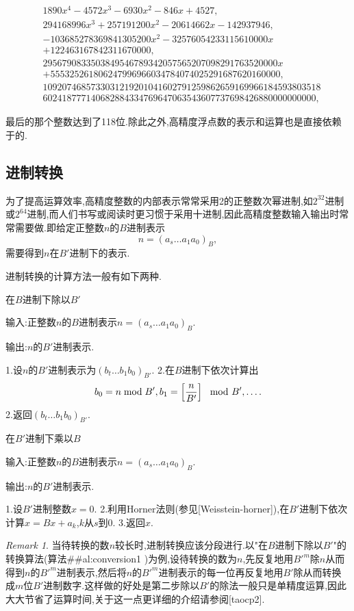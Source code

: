 \documentclass{ctexart}
\newcommand\mtcasCite[1]{[#1]}
\theoremstyle{remark}
\newtheorem{remark}{Remark}
\theoremstyle{definition}
\begin{document}
\begin{align*}
&1890x^4-4572x^3-6930x^2-846x+4527,\\
&294168996x^3+257191200x^2-20614662x-142937946,\\
&-103685278369841305200x^2-32576054233115610000x\\
&+122463167842311670000,\\
&2956790833503849546789342057565207098291763520000x\\
&+555325261806247996966034784074025291687620160000,\\
&1092074685733031219201041602791259862659169966184593803518\\
&602418777140682884334769647063543607737698426880000000000,
\end{align*}

最后的那个整数达到了118位.除此之外,高精度浮点数的表示和运算也是直接依赖于的.

\subsection{进制转换}

为了提高运算效率,高精度整数的内部表示常常采用2的正整数次幂进制,如$2^{32}$进制或$2^{64}$进制,而人们书写或阅读时更习惯于采用十进制,因此高精度整数输入输出时常常需要做.即给定正整数$n$的$B$进制表示$$n=(a_s\ldots a_1a_0)_B,$$需要得到$n$在$B'$进制下的表示.

进制转换的计算方法一般有如下两种.
\begin{algorithm}{在$B$进制下除以$B'$}\label{al:conversion1}

输入:正整数$n$的$B$进制表示$n=(a_s\ldots a_1a_0)_B$.

输出:$n$的$B'$进制表示.

 1.设$n$的$B'$进制表示为$(b_t \ldots b_1b_0)_{B'}$.
 2.在$B$进制下依次计算出$$b_0=n\bmod B',b_1=\left[{n\over B'}\right]\mod B',\ldots.$$
 2.返回$(b_t\ldots b_1b_0)_{B'}$.
\end{algorithm}
\begin{algorithm}{在$B'$进制下乘以$B$}\label{al:conversion2}

输入:正整数$n$的$B$进制表示$n=(a_s\ldots a_1a_0)_B$.

输出:$n$的$B'$进制表示.

 1.设$B'$进制整数$x=0$.
 2.利用Horner法则(参见\mtcasCite{Weisstein-horner}),在$B'$进制下依次计算$x=Bx+a_k$,$k$从$s$到0.
 3.返回$x$.
\end{algorithm}
\begin{remark}
当待转换的数$n$较长时,进制转换应该分段进行.以"在$B$进制下除以$B'$"的转换算法(算法##al:conversion1
)为例,设待转换的数为$n$,先反复地用$B'^m$除$n$从而得到$n$的$B'^m$进制表示,然后将$n$的$B'^m$进制表示的每一位再反复地用$B'$除从而转换成$m$位$B'$进制数字.这样做的好处是第二步除以$B'$的除法一般只是单精度运算,因此大大节省了运算时间,关于这一点更详细的介绍请参阅\mtcasCite{taocp2}.
\end{remark}
\end{document}
